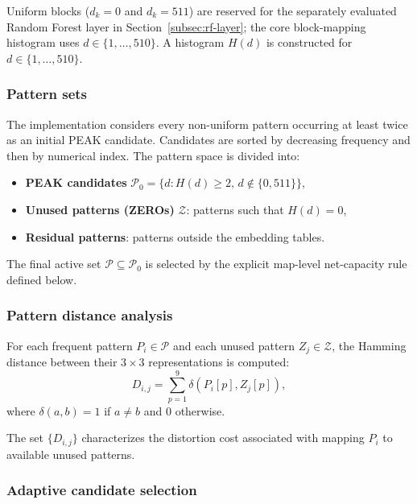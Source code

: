 Uniform blocks ($d_k = 0$ and $d_k = 511$) are reserved for the separately
evaluated Random Forest layer in Section~\ref{subsec:rf-layer}; the core
block-mapping histogram uses $d\in\{1,\ldots,510\}$.
A histogram $H(d)$ is constructed for $d \in \{1,\ldots,510\}$.

\subsubsection*{Pattern sets}

The implementation considers every non-uniform pattern occurring at least
twice as an initial PEAK candidate. Candidates are sorted by decreasing
frequency and then by numerical index. The pattern space is divided into:
\begin{itemize}
    \item \textbf{PEAK candidates} $\mathcal{P}_0=\{d:H(d)\geq2,\,
    d\notin\{0,511\}\}$,
    \item \textbf{Unused patterns (ZEROs)} $\mathcal{Z}$: patterns such that $H(d)=0$,
\RevisionAddBegin
    \item \textbf{Residual patterns}: patterns outside the embedding tables.
\RevisionAddEnd
\end{itemize}

The final active set $\mathcal{P}\subseteq\mathcal{P}_0$ is selected by the
\RevisionAddBegin
explicit map-level net-capacity rule defined below.
\RevisionAddEnd

\subsubsection*{Pattern distance analysis}

For each frequent pattern $P_i \in \mathcal{P}$ and each unused pattern $Z_j \in \mathcal{Z}$,
the Hamming distance between their $3 \times 3$ representations is computed:
\begin{equation}
D_{i,j} = \sum_{p=1}^{9} \delta(P_i[p], Z_j[p]),
\label{eq:hamming-distance}
\end{equation}
where $\delta(a,b)=1$ if $a\neq b$ and $0$ otherwise.

The set $\{D_{i,j}\}$ characterizes the distortion cost associated with mapping $P_i$ to available unused patterns.

\subsubsection*{Adaptive candidate selection}

